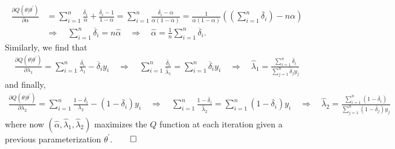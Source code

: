 \documentclass[10pt]{article}
\newcommand{\bp}[1]{\left({#1}\right)}
\newcommand{\1}[1]{\mathbbm{1}_{#1}}
\begin{document}
    \begin{align*}
        \frac{\partial Q(\theta|\theta^\prime)}{\partial\alpha}&=\sum_{i=1}^n\frac{\overline{\delta}_i}{\alpha}+\frac{\overline{\delta}_i-1}{1-\alpha}=\sum_{i=1}^n\frac{\overline{\delta}_i-\alpha}{\alpha(1-\alpha)}=\frac{1}{\alpha(1-\alpha)}\bp{\bp{\sum_{i=1}^n\overline{\delta}_i}-n\alpha}\\
        &\Rightarrow\quad \sum_{i=1}^n\overline{\delta}_i=n\hat{\alpha}\quad\Rightarrow\quad \hat{\alpha}=\frac{1}{n}\sum_{i=1}^n\overline{\delta}_i.
    \end{align*}
    Similarly, we find that
    \begin{align*}
        \frac{\partial Q(\theta|\theta^\prime)}{\partial\lambda_1}=\sum_{i=1}^n\frac{\overline{\delta}_i}{\lambda_1}-\overline{\delta}_iy_i\quad\Rightarrow\quad\sum_{i=1}^n\frac{\overline{\delta}_i}{\hat{\lambda}_1}=\sum_{i=1}^n\overline{\delta}_iy_i\quad\Rightarrow\quad\hat{\lambda}_1=\frac{\sum_{i=1}^n\overline{\delta}_i}{\sum_{j=1}^n\overline{\delta}_jy_j}
    \end{align*}
    and finally,
    \begin{align*}
        \frac{\partial Q(\theta|\theta^\prime)}{\partial\lambda_2}=\sum_{i=1}^n\frac{1-\overline{\delta}_i}{\lambda_2}-(1-\overline{\delta}_i)y_i\quad\Rightarrow\quad\sum_{i=1}^n\frac{1-\overline{\delta}_i}{\hat{\lambda}_2}=\sum_{i=1}^n(1-\overline{\delta}_i)y_i\quad\Rightarrow\quad\hat{\lambda}_2=\frac{\sum_{i=1}^n(1-\overline{\delta}_i)}{\sum_{j=1}^n(1-\overline{\delta}_j)y_j}
    \end{align*}
    where now $(\hat{\alpha},\hat{\lambda}_1,\hat{\lambda}_2)$ maximizes the $Q$ function at each iteration given a previous parameterization $\theta^\prime$.\hfill{$\qed$}
\end{document}
